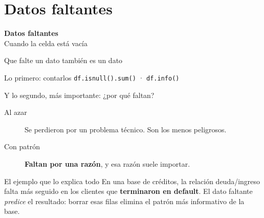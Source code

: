 \documentclass[aspectratio=169,10pt]{beamer}
\begin{document}
\section{Datos faltantes}

{
\begin{frame}[plain]
  \begin{center}
    {\Huge\bfseries\color{violetaOscuro} Datos faltantes}\\[0.6em]
    {\large Cuando la celda está vacía}
  \end{center}
\end{frame}}

\begin{frame}{Que falte un dato también es un dato}
  \begin{block}{Lo primero: contarlos}
    \texttt{df.isnull().sum()} \quad · \quad \texttt{df.info()}
  \end{block}
  \vspace{0.4em}
  \begin{block}{Y lo segundo, más importante: ¿por qué faltan?}
    \begin{description}
      \item[Al azar] Se perdieron por un problema técnico. Son los menos peligrosos.
      \item[Con patrón] \textbf{Faltan por una razón}, y esa razón suele importar.
    \end{description}
  \end{block}
  \vspace{0.3em}
  \begin{alertblock}{El ejemplo que lo explica todo}
    En una base de créditos, la relación deuda/ingreso falta más seguido en los clientes que
    \textbf{terminaron en default}. El dato faltante \emph{predice} el resultado:
    borrar esas filas elimina el patrón más informativo de la base.
  \end{alertblock}
\end{frame}
\end{document}
